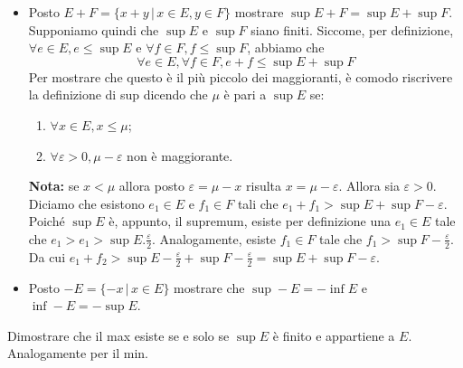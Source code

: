 \documentclass[a4paper]{article}
\begin{document}
\begin{snippetexercise}{}
\begin{itemize}
\[        \]
        Per quali \(n\) vale che \(\frac{4}{5} \leq \frac{x+1}{x+2} = x_n\)?
        Abbiamo \(4(n+2) \leq 5(n+1)\) e quindi \(n \geq 3\).
        Allora \(\sup E_1 \cap F = 1\) e non vi è massimo, mentre \(\inf E_1 \cap F = \frac{4}{5}\)
        che è anche il minimo.
        \item Posto \(E+F = \{ x + y \,|\, x \in E, y \in F \}\)
        mostrare \(\sup E + F = \sup E + \sup F\). Supponiamo quindi che \(\sup E\) e \(\sup F\)
        siano finiti. Siccome, per definizione, \(\forall e \in E, e \leq \sup E\)
        e \(\forall f \in F, f \leq \sup F\), abbiamo che \[\forall e \in E, \forall f\in F, e + f \leq \sup E + \sup F\]
        Per mostrare che questo è il più piccolo dei maggioranti, è comodo riscrivere la definizione di
        sup dicendo che \(\mu\) è pari a \(\sup E\) se:
        \begin{enumerate}
            \item \(\forall x \in E, x\leq \mu\);
            \item \(\forall \varepsilon > 0, \mu - \varepsilon\) non è maggiorante.
        \end{enumerate}
        \textbf{Nota:} se \(x < \mu\) allora posto \(\varepsilon = \mu - x\) risulta \(x = \mu - \varepsilon\).
        Allora sia \(\varepsilon > 0\). Diciamo che esistono \(e_1\in E\) e \(f_1\in F\) tali che
        \(e_1 + f_1 > \sup E + \sup F - \varepsilon\).
        Poiché \(\sup E\) è, appunto, il supremum, esiste per definizione una \(e_1 \in E\) tale che
        \(e_1 > e_1 > \sup E . \frac{\varepsilon}{2}\).
        Analogamente, esiste \(f_1 \in F\) tale che \(f_1 > \sup F - \frac{\varepsilon}{2}\).
        Da cui \(e_1 + f_2 > \sup E - \frac{\varepsilon}{2} + \sup F - \frac{\varepsilon}{2} = \sup E + \sup F - \varepsilon\).
        \item Posto \(-E = \{ -x \,|\, x \in E\}\) mostrare che
        \(\sup -E = -\inf E\) e \(\inf -E = -\sup E\).
    \end{itemize}
\end{snippetexercise}

Dimostrare che il max esiste se e solo se \(\sup E\) è finito e appartiene a \(E\).
Analogamente per il min.
\end{document}
